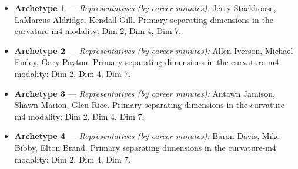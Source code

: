 \begin{itemize}
\item \textbf{Archetype 1} --- \emph{Representatives (by career minutes):} Jerry Stackhouse, LaMarcus Aldridge, Kendall Gill. Primary separating dimensions in the curvature-m4 modality: Dim 2, Dim 4, Dim 7.
\item \textbf{Archetype 2} --- \emph{Representatives (by career minutes):} Allen Iverson, Michael Finley, Gary Payton. Primary separating dimensions in the curvature-m4 modality: Dim 2, Dim 4, Dim 7.
\item \textbf{Archetype 3} --- \emph{Representatives (by career minutes):} Antawn Jamison, Shawn Marion, Glen Rice. Primary separating dimensions in the curvature-m4 modality: Dim 2, Dim 4, Dim 7.
\item \textbf{Archetype 4} --- \emph{Representatives (by career minutes):} Baron Davis, Mike Bibby, Elton Brand. Primary separating dimensions in the curvature-m4 modality: Dim 2, Dim 4, Dim 7.
\end{itemize}
